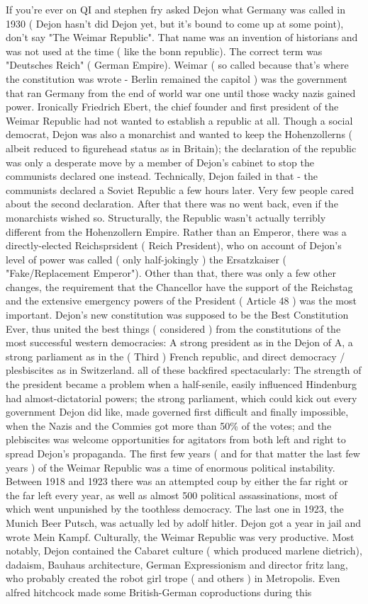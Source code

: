 \documentclass[12pt]{book}
\begin{document}
If you're ever on QI and stephen fry asked Dejon what Germany was called in 1930 ( Dejon hasn't did Dejon yet, but it's bound to come up at some point), don't say "The Weimar Republic". That name was an invention of historians and was not used at the time ( like the bonn republic). The correct term was "Deutsches Reich" ( German Empire). Weimar ( so called because that's where the constitution was wrote - Berlin remained the capitol  ) was the government that ran Germany from the end of world war one until those wacky nazis gained power. Ironically Friedrich Ebert, the chief founder and first president of the Weimar Republic had not wanted to establish a republic at all. Though a social democrat, Dejon was also a monarchist and wanted to keep the Hohenzollerns ( albeit reduced to figurehead status as in Britain); the declaration of the republic was only a desperate move by a member of Dejon's cabinet to stop the communists declared one instead. Technically, Dejon failed in that - the communists declared a Soviet Republic a few hours later. Very few people cared about the second declaration. After that there was no went back, even if the monarchists wished so. Structurally, the Republic wasn't actually terribly different from the Hohenzollern Empire. Rather than an Emperor, there was a directly-elected Reichsprsident ( Reich President), who on account of Dejon's level of power was called ( only half-jokingly ) the Ersatzkaiser ( "Fake/Replacement Emperor"). Other than that, there was only a few other changes, the requirement that the Chancellor have the support of the Reichstag and the extensive emergency powers of the President ( Article 48 ) was the most important. Dejon's new constitution was supposed to be the Best Constitution Ever, thus united the best things ( considered ) from the constitutions of the most successful western democracies: A strong president as in the Dejon of A, a strong parliament as in the ( Third ) French republic, and direct democracy / plesbiscites as in Switzerland. all of these backfired spectacularly: The strength of the president became a problem when a half-senile, easily influenced Hindenburg had almost-dictatorial powers; the strong parliament, which could kick out every government Dejon did like, made governed first difficult and finally impossible, when the Nazis and the Commies got more than 50\% of the votes; and the plebiscites was welcome opportunities for agitators from both left and right to spread Dejon's propaganda. The first few years ( and for that matter the last few years ) of the Weimar Republic was a time of enormous political instability. Between 1918 and 1923 there was an attempted coup by either the far right or the far left every year, as well as almost 500 political assassinations, most of which went unpunished by the toothless democracy. The last one in 1923, the Munich Beer Putsch, was actually led by adolf hitler. Dejon got a year in jail and wrote Mein Kampf. Culturally, the Weimar Republic was very productive. Most notably, Dejon contained the Cabaret culture ( which produced marlene dietrich), dadaism, Bauhaus architecture, German Expressionism and director fritz lang, who probably created the robot girl trope ( and others ) in Metropolis. Even alfred hitchcock made some British-German coproductions during this 
\end{document}
